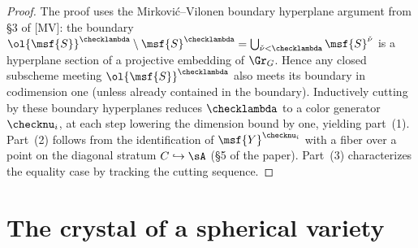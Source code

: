 \begin{proof}
  The proof uses the Mirković--Vilonen boundary hyperplane argument from §3 of [MV]:
  the boundary \( \ol{\msf{S}}^{\checklambda} \setminus \msf{S}^{\checklambda}
  = \bigcup_{\check{\nu} < \checklambda} \msf{S}^{\check{\nu}} \)
  is a hyperplane section of a projective embedding of \( \Gr_G \).
  Hence any closed subscheme meeting \( \ol{\msf{S}}^{\checklambda} \) also meets
  its boundary in codimension one (unless already contained in the boundary).
  Inductively cutting by these boundary hyperplanes reduces \( \checklambda \) to a
  color generator \( \checknu_i \), at each step lowering the dimension bound by one,
  yielding part~(1).
  Part~(2) follows from the identification of \( \msf{Y}^{\checknu_i} \) with a fiber over a
  point on the diagonal stratum \( C \hookrightarrow \sA \) (§5 of the paper).
  Part~(3) characterizes the equality case by tracking the cutting sequence.
\end{proof}


\section{The crystal of a spherical variety}

